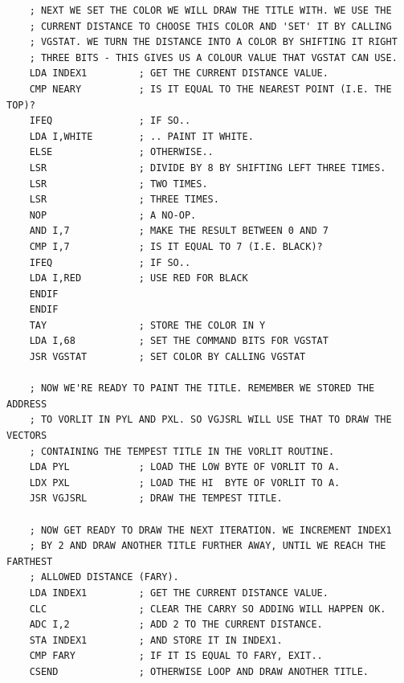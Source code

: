 \begin{lstlisting}
    ; NEXT WE SET THE COLOR WE WILL DRAW THE TITLE WITH. WE USE THE
    ; CURRENT DISTANCE TO CHOOSE THIS COLOR AND 'SET' IT BY CALLING
    ; VGSTAT. WE TURN THE DISTANCE INTO A COLOR BY SHIFTING IT RIGHT
    ; THREE BITS - THIS GIVES US A COLOUR VALUE THAT VGSTAT CAN USE.
    LDA INDEX1         ; GET THE CURRENT DISTANCE VALUE.
    CMP NEARY          ; IS IT EQUAL TO THE NEAREST POINT (I.E. THE TOP)?
    IFEQ               ; IF SO..
    LDA I,WHITE        ; .. PAINT IT WHITE.
    ELSE               ; OTHERWISE..
    LSR                ; DIVIDE BY 8 BY SHIFTING LEFT THREE TIMES.
    LSR                ; TWO TIMES.
    LSR                ; THREE TIMES.
    NOP                ; A NO-OP.
    AND I,7            ; MAKE THE RESULT BETWEEN 0 AND 7
    CMP I,7            ; IS IT EQUAL TO 7 (I.E. BLACK)?
    IFEQ               ; IF SO..
    LDA I,RED          ; USE RED FOR BLACK
    ENDIF
    ENDIF
    TAY                ; STORE THE COLOR IN Y
    LDA I,68           ; SET THE COMMAND BITS FOR VGSTAT
    JSR VGSTAT         ; SET COLOR BY CALLING VGSTAT
    
    ; NOW WE'RE READY TO PAINT THE TITLE. REMEMBER WE STORED THE ADDRESS
    ; TO VORLIT IN PYL AND PXL. SO VGJSRL WILL USE THAT TO DRAW THE VECTORS
    ; CONTAINING THE TEMPEST TITLE IN THE VORLIT ROUTINE.
    LDA PYL            ; LOAD THE LOW BYTE OF VORLIT TO A.
    LDX PXL            ; LOAD THE HI  BYTE OF VORLIT TO A.
    JSR VGJSRL         ; DRAW THE TEMPEST TITLE.
    
    ; NOW GET READY TO DRAW THE NEXT ITERATION. WE INCREMENT INDEX1
    ; BY 2 AND DRAW ANOTHER TITLE FURTHER AWAY, UNTIL WE REACH THE FARTHEST
    ; ALLOWED DISTANCE (FARY).
    LDA INDEX1         ; GET THE CURRENT DISTANCE VALUE.
    CLC                ; CLEAR THE CARRY SO ADDING WILL HAPPEN OK.
    ADC I,2            ; ADD 2 TO THE CURRENT DISTANCE.
    STA INDEX1         ; AND STORE IT IN INDEX1.
    CMP FARY           ; IF IT IS EQUAL TO FARY, EXIT..
    CSEND              ; OTHERWISE LOOP AND DRAW ANOTHER TITLE.
\end{lstlisting}

